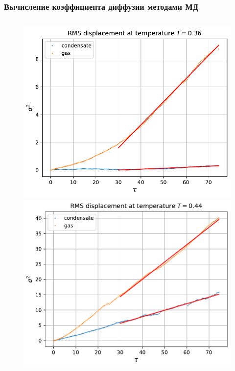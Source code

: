 \documentclass[pdf,hyperref={unicode}]{beamer}
\begin{document}
\begin{frame}
\transdissolve[duration=0.2]
\frametitle{Вычисление коэффициента диффузии методами МД}

\begin{columns}

\begin{column}{0.55\linewidth}

\begin{figure}[h]
\begin{center}
\begin{minipage}[h]{0.45\linewidth}
\includegraphics[width=\textwidth, keepaspectratio]{diffusion_fit_0.36}
\end{minipage}
\begin{minipage}[h]{0.45\linewidth}
\includegraphics[width=\textwidth, keepaspectratio]{diffusion_fit_0.44}
\end{minipage}


\end{center}
\end{figure}
\end{column}
\end{columns}
\end{frame}
\end{document}
